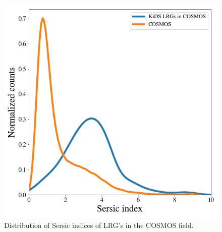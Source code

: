 \documentclass[fleqn,usenatbib,useAMS]{mnras}
\begin{document}
\begin{figure}
\includegraphics[width=\columnwidth]{figures_tmp/cosmos_sersic.png}
\caption{\label{fig:cosmos_sersic}Distribution of Sersic indices of LRG's in the COSMOS field.} 
\end{figure}
\end{document}

